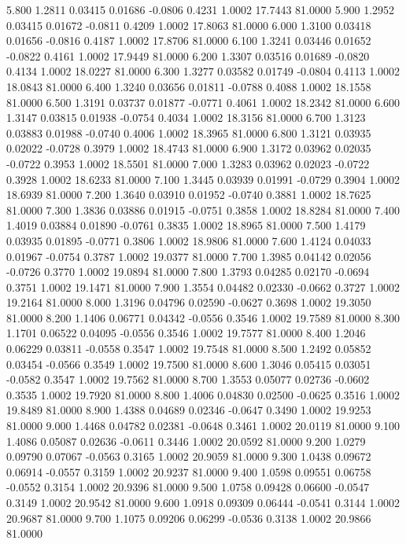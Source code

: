    5.800   1.2811   0.03415   0.01686  -0.0806   0.4231   1.0002  17.7443  81.0000
   5.900   1.2952   0.03415   0.01672  -0.0811   0.4209   1.0002  17.8063  81.0000
   6.000   1.3100   0.03418   0.01656  -0.0816   0.4187   1.0002  17.8706  81.0000
   6.100   1.3241   0.03446   0.01652  -0.0822   0.4161   1.0002  17.9449  81.0000
   6.200   1.3307   0.03516   0.01689  -0.0820   0.4134   1.0002  18.0227  81.0000
   6.300   1.3277   0.03582   0.01749  -0.0804   0.4113   1.0002  18.0843  81.0000
   6.400   1.3240   0.03656   0.01811  -0.0788   0.4088   1.0002  18.1558  81.0000
   6.500   1.3191   0.03737   0.01877  -0.0771   0.4061   1.0002  18.2342  81.0000
   6.600   1.3147   0.03815   0.01938  -0.0754   0.4034   1.0002  18.3156  81.0000
   6.700   1.3123   0.03883   0.01988  -0.0740   0.4006   1.0002  18.3965  81.0000
   6.800   1.3121   0.03935   0.02022  -0.0728   0.3979   1.0002  18.4743  81.0000
   6.900   1.3172   0.03962   0.02035  -0.0722   0.3953   1.0002  18.5501  81.0000
   7.000   1.3283   0.03962   0.02023  -0.0722   0.3928   1.0002  18.6233  81.0000
   7.100   1.3445   0.03939   0.01991  -0.0729   0.3904   1.0002  18.6939  81.0000
   7.200   1.3640   0.03910   0.01952  -0.0740   0.3881   1.0002  18.7625  81.0000
   7.300   1.3836   0.03886   0.01915  -0.0751   0.3858   1.0002  18.8284  81.0000
   7.400   1.4019   0.03884   0.01890  -0.0761   0.3835   1.0002  18.8965  81.0000
   7.500   1.4179   0.03935   0.01895  -0.0771   0.3806   1.0002  18.9806  81.0000
   7.600   1.4124   0.04033   0.01967  -0.0754   0.3787   1.0002  19.0377  81.0000
   7.700   1.3985   0.04142   0.02056  -0.0726   0.3770   1.0002  19.0894  81.0000
   7.800   1.3793   0.04285   0.02170  -0.0694   0.3751   1.0002  19.1471  81.0000
   7.900   1.3554   0.04482   0.02330  -0.0662   0.3727   1.0002  19.2164  81.0000
   8.000   1.3196   0.04796   0.02590  -0.0627   0.3698   1.0002  19.3050  81.0000
   8.200   1.1406   0.06771   0.04342  -0.0556   0.3546   1.0002  19.7589  81.0000
   8.300   1.1701   0.06522   0.04095  -0.0556   0.3546   1.0002  19.7577  81.0000
   8.400   1.2046   0.06229   0.03811  -0.0558   0.3547   1.0002  19.7548  81.0000
   8.500   1.2492   0.05852   0.03454  -0.0566   0.3549   1.0002  19.7500  81.0000
   8.600   1.3046   0.05415   0.03051  -0.0582   0.3547   1.0002  19.7562  81.0000
   8.700   1.3553   0.05077   0.02736  -0.0602   0.3535   1.0002  19.7920  81.0000
   8.800   1.4006   0.04830   0.02500  -0.0625   0.3516   1.0002  19.8489  81.0000
   8.900   1.4388   0.04689   0.02346  -0.0647   0.3490   1.0002  19.9253  81.0000
   9.000   1.4468   0.04782   0.02381  -0.0648   0.3461   1.0002  20.0119  81.0000
   9.100   1.4086   0.05087   0.02636  -0.0611   0.3446   1.0002  20.0592  81.0000
   9.200   1.0279   0.09790   0.07067  -0.0563   0.3165   1.0002  20.9059  81.0000
   9.300   1.0438   0.09672   0.06914  -0.0557   0.3159   1.0002  20.9237  81.0000
   9.400   1.0598   0.09551   0.06758  -0.0552   0.3154   1.0002  20.9396  81.0000
   9.500   1.0758   0.09428   0.06600  -0.0547   0.3149   1.0002  20.9542  81.0000
   9.600   1.0918   0.09309   0.06444  -0.0541   0.3144   1.0002  20.9687  81.0000
   9.700   1.1075   0.09206   0.06299  -0.0536   0.3138   1.0002  20.9866  81.0000
